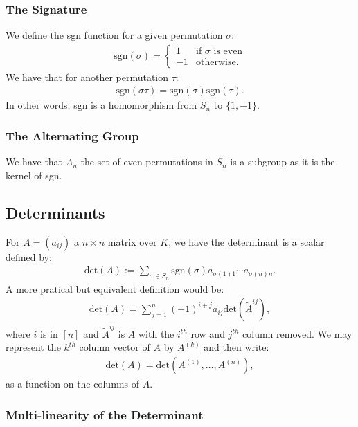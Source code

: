 \subsubsection{The Signature}

We define the sgn function for a given
permutation $\sigma$: \begin{gather*}
  \text{sgn}(\sigma) = \begin{cases}
    1 & \text{if } \sigma \text{ is even} \\
    -1 & \text{otherwise.}
  \end{cases}
\end{gather*} We have that for another permutation $\tau$: \begin{gather*}
  \text{sgn}(\sigma\tau) = \text{sgn}(\sigma)\text{sgn}(\tau).
\end{gather*} In other words, sgn is a homomorphism from $S_n$ to $\{1, -1\}$.

\subsubsection{The Alternating Group}

We have that $A_n$ the set of even permutations in $S_n$ is a
subgroup as it is the kernel of sgn.

\subsection{Determinants}

For $A = (a_{ij})$ a $n \times n$ matrix over $K$, we have
the determinant is a scalar defined by: \begin{gather*}
  \text{det}(A) := \sum_{\sigma \in S_n} \text{sgn}(\sigma)a_{\sigma(1)1} \cdots a_{\sigma(n)n}.
\end{gather*} A more pratical but equivalent definition would be: \begin{gather*}
  \text{det}(A) = \sum_{j = 1}^n (-1)^{i + j}a_{ij}\text{det}(\tilde{A}^{ij}),
\end{gather*} where $i$ is in $[n]$ and $\tilde{A}^{ij}$ is $A$
with the $i^{th}$ row and $j^{th}$ column removed. 
We may represent the $k^{th}$ column vector of $A$ by 
$A^{(k)}$ and then write: \begin{gather*}
  \text{det}(A) = \text{det}(A^{(1)}, \ldots, A^{(n)}),
\end{gather*} as a function on the columns of $A$.

\subsubsection{Multi-linearity of the Determinant}

